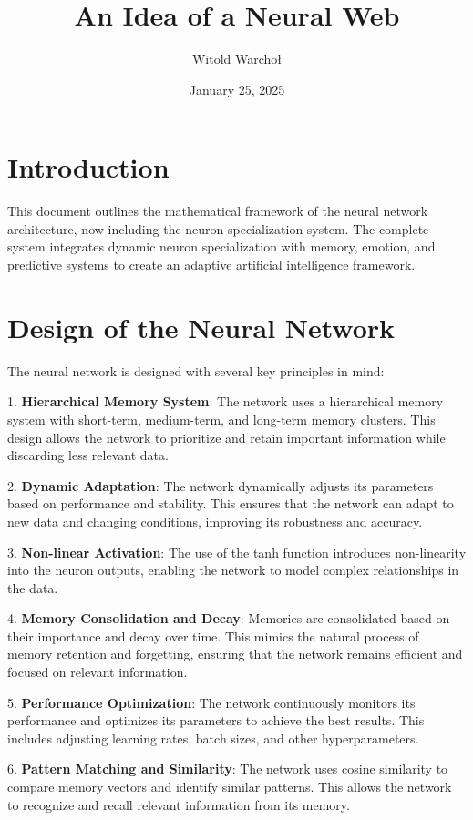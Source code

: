 \documentclass{article}
\title{An Idea of a Neural Web}
\author{Witold Warchoł}
\date{January 25, 2025}
\begin{document}
\maketitle

\section{Introduction}
This document outlines the mathematical framework of the neural network architecture, now including the neuron specialization system. The complete system integrates dynamic neuron specialization with memory, emotion, and predictive systems to create an adaptive artificial intelligence framework.

\section{Design of the Neural Network}
The neural network is designed with several key principles in mind:

1. \textbf{Hierarchical Memory System}: The network uses a hierarchical memory system with short-term, medium-term, and long-term memory clusters. This design allows the network to prioritize and retain important information while discarding less relevant data.

2. \textbf{Dynamic Adaptation}: The network dynamically adjusts its parameters based on performance and stability. This ensures that the network can adapt to new data and changing conditions, improving its robustness and accuracy.

3. \textbf{Non-linear Activation}: The use of the tanh function introduces non-linearity into the neuron outputs, enabling the network to model complex relationships in the data.

4. \textbf{Memory Consolidation and Decay}: Memories are consolidated based on their importance and decay over time. This mimics the natural process of memory retention and forgetting, ensuring that the network remains efficient and focused on relevant information.

5. \textbf{Performance Optimization}: The network continuously monitors its performance and optimizes its parameters to achieve the best results. This includes adjusting learning rates, batch sizes, and other hyperparameters.

6. \textbf{Pattern Matching and Similarity}: The network uses cosine similarity to compare memory vectors and identify similar patterns. This allows the network to recognize and recall relevant information from its memory.
\end{document}
